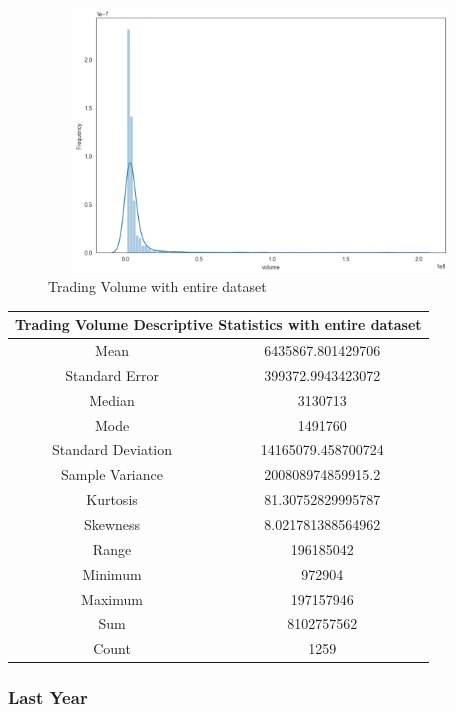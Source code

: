 \begin{figure}[h!]
    \centering
    \includegraphics[width=15cm,height=7cm,keepaspectratio]{resultsEvaluation/volumeDescMax.png}
    \caption{Trading Volume with entire dataset}
    \label{fig:appendix_volumeDescMax}
\end{figure}
\begin{center}
\begin{tabular}{ c c }
\hline
\multicolumn{2}{|c|}{Trading Volume Descriptive Statistics with entire dataset} \\
\hline
Mean & 6435867.801429706 \\
Standard Error & 399372.9943423072 \\
Median & 3130713 \\
Mode & 1491760 \\
Standard Deviation & 14165079.458700724 \\
Sample Variance & 200808974859915.2 \\
Kurtosis & 81.30752829995787 \\
Skewness & 8.021781388564962 \\
Range & 196185042 \\
Minimum & 972904 \\
Maximum & 197157946 \\
Sum & 8102757562 \\
Count & 1259
\end{tabular}
\end{center}

\subsubsection{Last Year}

